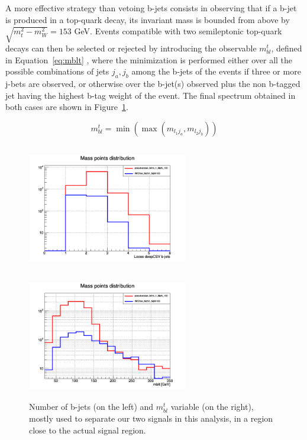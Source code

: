 \documentclass[a4paper, 10pt, openright]{report}
\begin{document}
A more effective strategy than vetoing b-jets consists in observing that if a b-jet is produced in a top-quark decay, its invariant mass is bounded from above by $\sqrt{m_t^2 - m_{W}^2} = 153$ GeV. Events compatible with two semileptonic top-quark decays can then be selected or rejected by introducing the observable $m_{bl}^t$, defined in Equation~\ref{eq:mblt} \cite{mblt}, where the minimization is performed either over all the possible combinations of jets {$j_a, j_b$} among the b-jets of the events if three or more j-bets are observed, or otherwise over the b-jet(s) observed plus the non b-tagged jet having the highest b-tag weight of the event. The final spectrum obtained in both cases are shown in Figure~\ref{fig:signalsDiscrimination}.

\begin{equation}
\label{eq:mblt}
m_{bl}^t = \min \left (\max(m_{l_1 j_a}, m_{l_2 j_b}) \right)
\end{equation}

\begin{figure}[htbp]
\centering
\begin{minipage}[b]{.48\textwidth}
\includegraphics[width=7cm, height=5.6cm]{figs/nbJet.png}
\end{minipage}\hfill
\begin{minipage}[b]{.48\textwidth}
\includegraphics[width=7cm, height=5.6cm]{figs/mblt.png}
\end{minipage} \hfill
\caption{Number of b-jets (on the left) and $m_{bl}^t$ variable (on the right), mostly used to separate our two signals in this analysis, in a region close to the actual signal region.}
\label{fig:signalsDiscrimination}
\end{figure}
\end{document}
